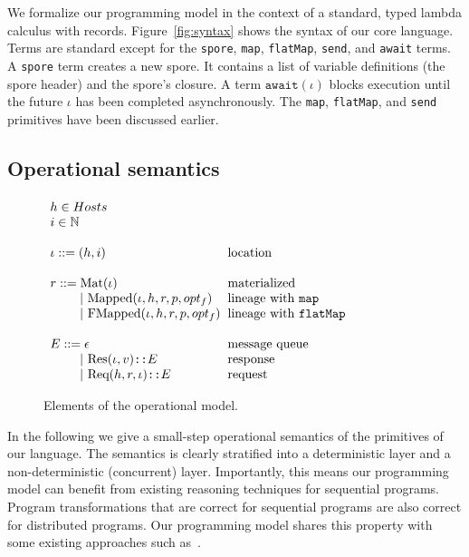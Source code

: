 \documentclass[preprint]{sigplanconf}
\theoremstyle{definition}
\theoremstyle{definition}
\newcommand{\gap}{\quad\quad}
\newcommand{\ba}{\begin{array}}
\newcommand{\ea}{\end{array}}
\begin{document}
We formalize our programming model in the context of a standard, typed lambda calculus with records. Figure~\ref{fig:syntax} shows the syntax of our core language. Terms are standard except for the \texttt{spore}, \texttt{map}, \texttt{flatMap}, \texttt{send}, and \texttt{await} terms. A \texttt{spore} term creates a new spore. It contains a list of variable definitions (the spore header) and the spore's closure. A term $\texttt{await}(\iota)$ blocks execution until the future $\iota$ has been completed asynchronously. The \texttt{map}, \texttt{flatMap}, and \texttt{send} primitives have been discussed earlier.


\subsection{Operational semantics}\label{sec:opsem}

\begin{figure}[ht!]
  \centering

  $\ba[t]{l@{\hspace{2mm}}l}
h \in Hosts &
\\
i \in \mathbb{N} &
\\
 & \\
\iota  ::=  (h, i)                               & \mbox{location}
\\
 & \\
r ::=     \text{Mat}(\iota) & \mbox{materialized}
\\
\gap ~|~  \text{Mapped}(\iota, h, r, p, opt_f)   & \mbox{lineage with \texttt{map}}
\\
\gap ~|~  \text{FMapped}(\iota, h, r, p, opt_f)  & \mbox{lineage with \texttt{flatMap}}
\\
 & \\
E      ::=  \epsilon & \mbox{message queue}
\\
\gap ~|~    \text{Res}(\iota, v) \texttt{::} E     & \mbox{response}
\\
\gap ~|~    \text{Req}(h, r, \iota) \texttt{::} E  & \mbox{request}
\\
  \ea$

  \vspace{1mm}
  \caption{Elements of the operational model.}
  \label{fig:elems-opsem}
  \vspace{1mm}
\end{figure}

In the following we give a small-step operational semantics of the primitives of our language. The semantics is clearly stratified into a deterministic layer and a non-deterministic (concurrent) layer. Importantly, this means our programming model can benefit from existing reasoning techniques for sequential programs. Program transformations that are correct for sequential programs are also correct for distributed programs. Our programming model shares this property with some existing approaches such as~\cite{ConcurrentHaskell}.
\end{document}

